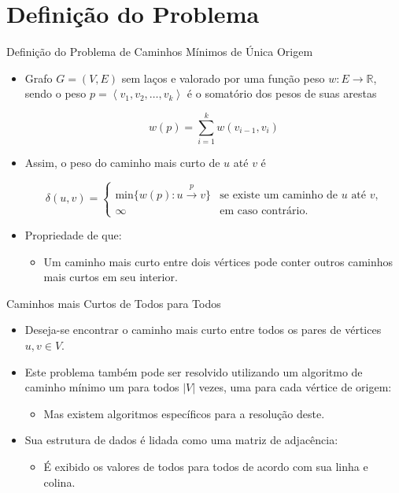\documentclass{beamer}
\begin{document}
\section{Definição do Problema}
	\begin{frame}{Definição do Problema de Caminhos Mínimos de Única Origem \cite{cormen2002algoritmos}} 
			
		\begin{itemize}
			\item Grafo $G = (V, E)$ sem laços e valorado por uma função peso $w : E \rightarrow \mathbb{R}$, sendo o peso $p = \left \langle v_{1}, v_{2}, \ldots, v_{k}  \right \rangle$ é o somatório dos pesos de suas arestas
		
			$$w(p) = \sum_{i=1}^{k} w(v_{i-1}, v_{i})$$
			
			\item Assim, o peso do caminho mais curto de $u$ até $v$ é 
		
			$$
			\delta(u, v) = 
			\begin{cases}
			\text{min}\{w(p):u\xrightarrow{p} v\} & \text{se existe um caminho de } u \text{ até } v\text{,}\\
			\infty & \text{em caso contrário.}
			\end{cases}
			$$
			
			\item Propriedade de que:
			\begin{itemize}
				\item  Um caminho mais curto entre dois vértices pode conter outros caminhos mais curtos em seu interior.
			\end{itemize}
		\end{itemize}
	\end{frame}
	
	
	\begin{frame}{Caminhos mais Curtos de Todos para Todos}
		\begin{itemize}
			\item Deseja-se encontrar o caminho mais curto entre todos os pares de vértices $u,v \in V$. 
			
			\bigskip
			
			\item Este problema também pode ser resolvido utilizando um algoritmo de caminho mínimo um para todos $|V|$ vezes, uma para cada vértice de origem:
			\begin{itemize}
				\item Mas existem algoritmos específicos para a resolução deste.
			\end{itemize}
			
			\bigskip
			
			\item Sua estrutura de dados é lidada como uma matriz de adjacência:
			\begin{itemize}
				\item  É exibido os valores de todos para todos de acordo com sua linha e colina.
			\end{itemize}
		\end{itemize}
	\end{frame}
	
\end{document}
